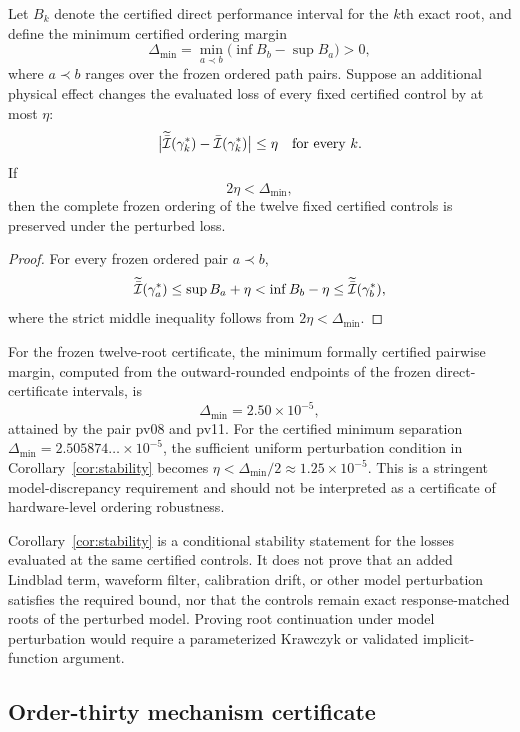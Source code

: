 \begin{corollary}\label{cor:stability}
Let $B_{k}$ denote the certified direct performance interval for the $k$th exact root, and
define the minimum certified ordering margin
\[
\Delta_{\min}=\min_{a\prec b}\bigl(\inf B_{b}-\sup B_{a}\bigr)>0,
\]
where $a\prec b$ ranges over the frozen ordered path pairs. Suppose an additional physical
effect changes the evaluated loss of every fixed certified control by at most $\eta$:
\[
\bigl\lvert\widetilde{\bar{\mathcal{I}}}(\gamma^{\ast}_{k})-\bar{\mathcal{I}}(\gamma^{\ast}_{k})\bigr\rvert\le\eta
\quad\text{for every }k.
\]
If
\[
2\eta<\Delta_{\min},
\]
then the complete frozen ordering of the twelve fixed certified controls is preserved under
the perturbed loss.
\end{corollary}

\begin{proof}
For every frozen ordered pair $a\prec b$,
\[
\widetilde{\bar{\mathcal{I}}}(\gamma^{\ast}_{a})\le\sup B_{a}+\eta
<\inf B_{b}-\eta\le\widetilde{\bar{\mathcal{I}}}(\gamma^{\ast}_{b}),
\]
where the strict middle inequality follows from $2\eta<\Delta_{\min}$.
\end{proof}

For the frozen twelve-root certificate, the minimum formally certified pairwise margin,
computed from the outward-rounded endpoints of the frozen direct-certificate intervals, is
\[
\Delta_{\min}=2.50\times10^{-5},
\]
attained by the pair pv08 and pv11.
For the certified minimum separation $\Delta_{\min}=2.505874\ldots\times10^{-5}$, the
sufficient uniform perturbation condition in Corollary~\ref{cor:stability} becomes
$\eta<\Delta_{\min}/2\approx1.25\times10^{-5}$. This is a stringent model-discrepancy
requirement and should not be interpreted as a certificate of hardware-level ordering
robustness.

Corollary~\ref{cor:stability} is a conditional stability statement for the losses evaluated
at the same certified controls. It does not prove that an added Lindblad term, waveform
filter, calibration drift, or other model perturbation satisfies the required bound, nor
that the controls remain exact response-matched roots of the perturbed model. Proving root
continuation under model perturbation would require a parameterized Krawczyk or validated
implicit-function argument.

\subsection{Order-thirty mechanism certificate}

